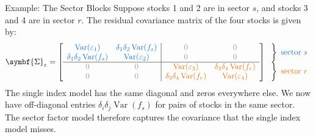 \documentclass[aspectratio=169,11pt]{beamer}
\begin{document}
\begin{frame}{Example: The Sector Blocks}
  \textbf{} Suppose stocks 1 and 2 are in sector $s$, and stocks 3 and 4 are in
  sector $r$. The residual covariance matrix of the four stocks is given by:
  \begin{equation*}
    \symbf{\Sigma}_{\varepsilon}=
    \left[\begin{array}{cc|cc}
    {\color[HTML]{1F6FB4} \operatorname{Var}(\varepsilon_{1})} & {\color[HTML]{1F6FB4} \delta_{1}\delta_{2}\operatorname{Var}(f_{s})} & {\color[HTML]{999999} 0} & {\color[HTML]{999999} 0}\\
    {\color[HTML]{1F6FB4} \delta_{1}\delta_{2}\operatorname{Var}(f_{s})} & {\color[HTML]{1F6FB4} \operatorname{Var}(\varepsilon_{2})} & {\color[HTML]{999999} 0} & {\color[HTML]{999999} 0}\\ \hline
    {\color[HTML]{999999} 0} & {\color[HTML]{999999} 0} & {\color[HTML]{D4720F} \operatorname{Var}(\varepsilon_{3})} & {\color[HTML]{D4720F} \delta_{3}\delta_{4}\operatorname{Var}(f_{r})}\\
    {\color[HTML]{999999} 0} & {\color[HTML]{999999} 0} & {\color[HTML]{D4720F} \delta_{3}\delta_{4}\operatorname{Var}(f_{r})} & {\color[HTML]{D4720F} \operatorname{Var}(\varepsilon_{4})}
    \end{array}\right]
    \begin{array}{l}\left.\vphantom{\begin{matrix}\operatorname{Var}(\varepsilon_{1})\\\operatorname{Var}(\varepsilon_{1})\end{matrix}}\right\}{\color[HTML]{1F6FB4} \text{ sector } s}\\ \left.\vphantom{\begin{matrix}\operatorname{Var}(\varepsilon_{1})\\\operatorname{Var}(\varepsilon_{1})\end{matrix}}\right\}{\color[HTML]{D4720F} \text{ sector } r}\end{array}
  \end{equation*}
  The single index model has the same diagonal and zeros everywhere else. We now have off-diagonal
  entries $\delta_i\delta_j\operatorname{Var}(f_s)$ for pairs of stocks in the same sector. The sector
  factor model therefore captures the covariance that the single index model misses.
\end{frame}
\end{document}
